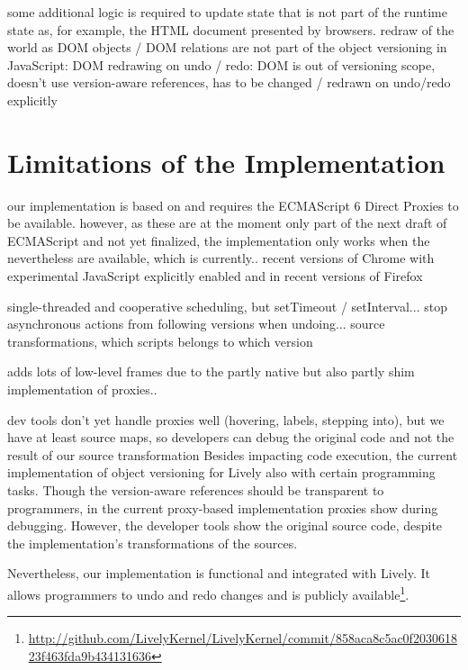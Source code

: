 some additional logic is required to update state that is not part of the runtime state as, for example, the HTML document presented by browsers.
redraw of the world as DOM objects / DOM relations are not part of the object versioning in JavaScript: DOM redrawing on undo / redo: DOM is out of versioning scope, doesn’t use version-aware references, has to be changed / redrawn on undo/redo explicitly





\section{Limitations of the Implementation}



our implementation is based on and requires the ECMAScript 6 Direct Proxies to be available.
however, as these are at the moment only part of the next draft of ECMAScript and not yet finalized, the implementation only works when the nevertheless are available, which is currently.. recent versions of Chrome with experimental JavaScript explicitly enabled and in recent versions of Firefox



single-threaded and cooperative scheduling, but setTimeout / setInterval... stop asynchronous actions from following versions when undoing... source transformations, which scripts belongs to which version




adds lots of low-level frames due to the partly native but also partly shim implementation of proxies..

dev tools don’t yet handle proxies well (hovering, labels, stepping into), but we have at least source maps, so developers can debug the original code and not the result of our source transformation
Besides impacting code execution, the current implementation of object versioning for Lively also with certain programming tasks.
Though the version-aware references should be transparent to programmers, in the current proxy-based implementation proxies show during debugging.
However, the developer tools show the original source code, despite the implementation's transformations of the sources.





Nevertheless, our implementation is functional and integrated with Lively.
It allows programmers to undo and redo changes and is publicly available\footnote{\url{http://github.com/LivelyKernel/LivelyKernel/commit/858aca8c5ac0f203061823f463fda9b434131636}}.
